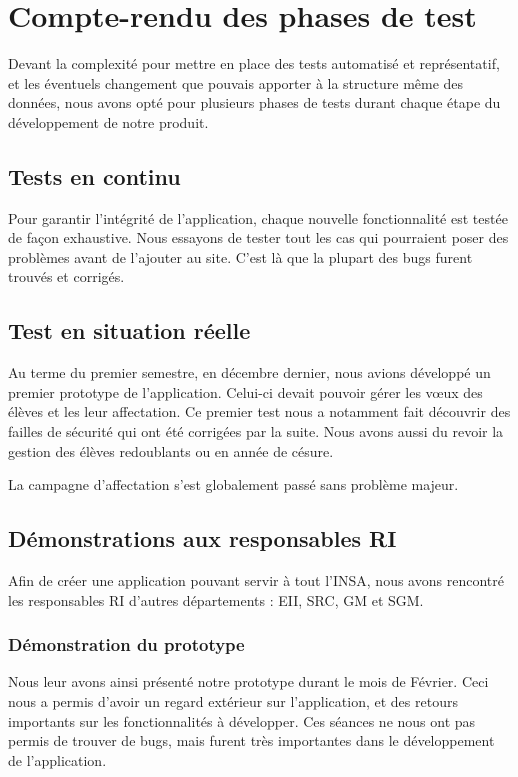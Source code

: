 \chapter{Compte-rendu des phases de test}

Devant la complexité pour mettre en place des tests automatisé et représentatif, et les éventuels changement que pouvais apporter à la structure même des données, nous avons opté pour plusieurs phases de tests durant chaque étape du développement de notre produit.

\section{Tests en continu}

Pour garantir l'intégrité de l'application, chaque nouvelle fonctionnalité est testée de façon exhaustive. Nous essayons de tester tout les cas qui pourraient poser des problèmes avant de l'ajouter au site. C'est là que la plupart des bugs furent trouvés et corrigés.

\section{Test en situation réelle}
Au terme du premier semestre, en décembre dernier, nous avions développé un premier prototype de l'application. Celui-ci devait pouvoir gérer les vœux des élèves et les leur affectation. 
Ce premier test nous a notamment fait découvrir des failles de sécurité qui ont été corrigées par la suite. Nous avons aussi du revoir la gestion des élèves redoublants ou en année de césure.

La campagne d'affectation s'est globalement passé sans problème majeur.

\section{Démonstrations aux responsables RI}
Afin de créer une application pouvant servir à tout l'INSA, nous avons rencontré les responsables RI d'autres départements : EII, SRC, GM et SGM. 
\subsection{Démonstration du prototype}
Nous leur avons ainsi présenté notre prototype durant le mois de Février. Ceci nous a permis d'avoir un regard extérieur sur l'application, et des retours importants sur les fonctionnalités à développer. Ces séances ne nous ont pas permis de trouver de bugs, mais furent très importantes dans le développement de l'application.
